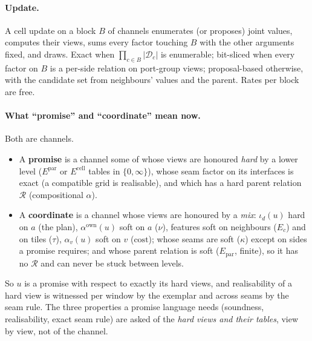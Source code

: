 \documentclass[11pt]{article}
\newcommand{\1}{\mathds{1}}
\newcommand{\Dom}{\mathcal{D}}
\newcommand{\refine}{\mathcal{R}}
\begin{document}
\paragraph{Update.} A cell update on a block $B$ of channels enumerates (or
proposes) joint values, computes their views, sums every factor touching $B$
with the other arguments fixed, and draws. Exact when $\prod_{c \in B}|\Dom_c|$
is enumerable; bit-sliced when every factor on $B$ is a per-side relation on
port-group views; proposal-based otherwise, with the candidate set from
neighbours' values and the parent. Rates per block are free.

\paragraph{What ``promise'' and ``coordinate'' mean now.} Both are channels.
\begin{itemize}
  \item A \textbf{promise} is a channel some of whose views are honoured
        \emph{hard} by a lower level ($E^{\mathrm{par}}$ or $E^{\mathrm{cell}}$ tables
        in $\{0, \infty\}$), whose seam factor on its interfaces is exact (a
        compatible grid is realisable), and which has a hard parent relation
        $\refine$ (compositional $\alpha$).
  \item A \textbf{coordinate} is a channel whose views are honoured by a
        \emph{mix}: $\iota_d(u)$ hard on $a$ (the plan), $\alpha^{\mathrm{own}}(u)$ soft on
        $a$ ($\nu$), features soft on neighbours ($E_c$) and on tiles ($\tau$),
        $\alpha_v(u)$ soft on $v$ ($\mathrm{cost}$); whose seams are soft ($\kappa$)
        except on sides a promise requires; and whose parent relation is soft
        ($E_{\mathrm{par}}$, finite), so it has no $\refine$ and can never be stuck
        between levels.
\end{itemize}
So $u$ is a promise with respect to exactly its hard views, and realisability
of a hard view is witnessed per window by the exemplar and across seams by the
seam rule. The three properties a promise language needs (soundness,
realisability, exact seam rule) are asked of the \emph{hard views and their
tables}, view by view, not of the channel.
\end{document}
